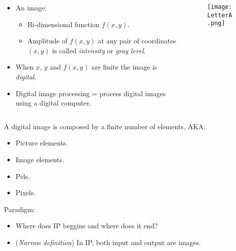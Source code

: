 \begin{frame}
\begin{columns}[T]
\begin{column}{.6\textwidth}
\begin{itemize}
\item An image:
\begin{itemize}
\item Bi-dimensional function $f(x,y)$.
\item Amplitude of $f(x,y)$ at any pair of coordinates $(x,y)$ is called \textit{intensity} or \textit{gray level}.
\end{itemize}
\item When $x$, $y$ and $f(x,y)$ are finite	the image is \textit{digital}.
\item Digital image processing = process digital images using a digital computer.
\end{itemize}
\end{column}
\begin{column}{.4\textwidth}
\begin{figure}
\texttt{[image: LetterA.png]}
\end{figure}
\end{column}
\end{columns}
\end{frame}


\begin{frame}
A digital image is composed by a finite number of elements, AKA:
\begin{itemize}
\item Picture elements.
\item Image elements.
\item Pels.
\item Pixels.
\end{itemize}
Paradigm:
\begin{itemize}
\item Where does IP beggins and where does it end?
\item (\textit{Narrow definition}) In IP, both input and output are images.
\end{itemize}
\end{frame}


